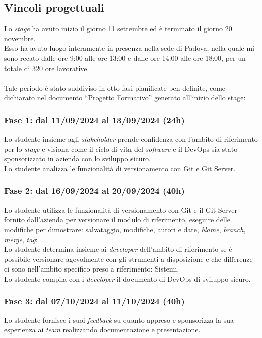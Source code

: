 \subsection{Vincoli progettuali}
Lo \emph{stage} ha avuto inizio il giorno 11 settembre ed è terminato il giorno 20 novembre.\\
Esso ha avuto luogo interamente in presenza nella sede di Padova, nella quale mi sono recato dalle ore 9:00 alle ore 13:00 e dalle ore 14:00 alle ore 18:00, per un totale di 320 ore lavorative.\\\\
Tale periodo è stato suddiviso in otto fasi pianificate ben definite, come dichiarato nel documento “Progetto Formativo” generato all'inizio dello stage:
\subsubsection*{Fase 1: dal 11/09/2024 al 13/09/2024 (24h)}
Lo studente insieme agli \emph{stakeholder} prende confidenza con l'ambito di riferimento per lo \emph{stage} e visiona come il ciclo di vita del \emph{software} e il \gls{DevOps} sia stato sponsorizzato in azienda con lo sviluppo sicuro.\\
Lo studente analizza le funzionalità di versionamento con Git e Git Server.\\

\subsubsection*{Fase 2: dal 16/09/2024 al 20/09/2024 (40h) }
Lo studente utilizza le funzionalità di versionamento con Git e il Git Server fornito dall'azienda per versionare il modulo di riferimento, eseguire delle modifiche per dimostrare: salvataggio, modifiche, autori e date, \emph{blame}, \emph{branch}, \emph{merge}, \emph{tag}:\\
Lo studente determina insieme ai \emph{developer} dell'ambito di riferimento se è possibile versionare agevolmente con gli strumenti a disposizione e che differenze ci sono nell'ambito specifico preso a riferimento: \gls{Sistemi}.\\
Lo studente compila con i \emph{developer} il documento di \gls{DevOps} di sviluppo sicuro.\\

\subsubsection*{Fase 3: dal 07/10/2024 al 11/10/2024 (40h) }
Lo studente fornisce i suoi \emph{feedback} su quanto appreso e sponsorizza la sua esperienza ai \emph{team} realizzando documentazione e presentazione.\\


